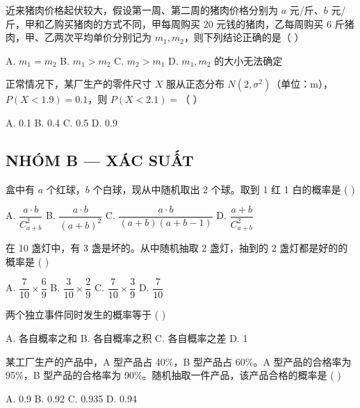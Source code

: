 \documentclass[11pt, a4paper]{article}
\begin{document}
\begin{baitap}[12]
近来猪肉价格起伏较大，假设第一周、第二周的猪肉价格分别为 $a$ 元/斤、$b$ 元/斤，甲和乙购买猪肉的方式不同，甲每周购买 20 元钱的猪肉，乙每周购买 6 斤猪肉，甲、乙两次平均单价分别记为 $m_1, m_2$，则下列结论正确的是（ ）
\par\vspace{3pt}
\noindent A. $m_1 = m_2$ \quad B. $m_1 > m_2$ \quad C. $m_2 > m_1$ \quad D. $m_1, m_2$ 的大小无法确定
\end{baitap}

\begin{baitap}[13]
正常情况下，某厂生产的零件尺寸 $X$ 服从正态分布 $N(2, \sigma^2)$（单位：m），$P(X < 1.9) = 0.1$，则 $P(X < 2.1) =$（ ）
\par\vspace{3pt}
\noindent A. 0.1 \quad B. 0.4 \quad C. 0.5 \quad D. 0.9
\end{baitap}

\subsection*{NHÓM B — XÁC SUẤT}

\begin{baitap}[14]
盒中有 $a$ 个红球，$b$ 个白球，现从中随机取出 2 个球。取到 1 红 1 白的概率是 ( )
\par\vspace{3pt}
\noindent A. $\dfrac{a \cdot b}{C_{a+b}^2}$ \quad B. $\dfrac{a \cdot b}{(a+b)^2}$ \quad C. $\dfrac{a \cdot b}{(a+b)(a+b-1)}$ \quad D. $\dfrac{a+b}{C_{a+b}^2}$
\end{baitap}

\begin{baitap}[15]
在 10 盏灯中，有 3 盏是坏的。从中随机抽取 2 盏灯，抽到的 2 盏灯都是好的的概率是 ( )
\par\vspace{3pt}
\noindent A. $\dfrac{7}{10} \times \dfrac{6}{9}$ \quad B. $\dfrac{3}{10} \times \dfrac{2}{9}$ \quad C. $\dfrac{7}{10} \times \dfrac{3}{9}$ \quad D. $\dfrac{7}{10}$
\end{baitap}

\begin{baitap}[16]
两个独立事件同时发生的概率等于 ( )
\par\vspace{3pt}
\noindent A. 各自概率之和 \quad B. 各自概率之积 \quad C. 各自概率之差 \quad D. 1
\end{baitap}

\begin{baitap}[17]
某工厂生产的产品中，A 型产品占 40\%，B 型产品占 60\%。A 型产品的合格率为 95\%，B 型产品的合格率为 90\%。随机抽取一件产品，该产品合格的概率是 ( )
\par\vspace{3pt}
\noindent A. 0.9 \quad B. 0.92 \quad C. 0.935 \quad D. 0.94
\end{baitap}
\end{document}
